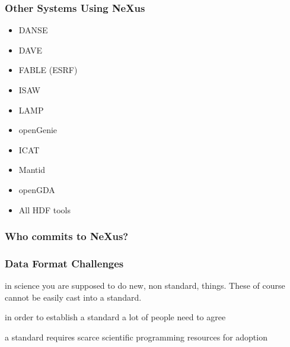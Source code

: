 \documentclass{beamer}
\begin{document}
\begin{frame} \frametitle{Other Systems Using NeXus}
\begin{itemize}
\item DANSE
\item DAVE
\item FABLE (ESRF)
\item ISAW
\item LAMP
\item openGenie
\item ICAT
\item Mantid
\item openGDA
\item All HDF tools
\end{itemize}
\end{frame}

\begin{frame} \frametitle{Who commits to NeXus? }
\begin{figure}[!ht]
\end{figure}
\end{frame}

\begin{frame} \frametitle{Data Format Challenges}
\begin{description}
\item<1->[Challenge 1] in science you are supposed to do new, non standard, things.  
 These of course cannot be easily cast into a standard.
\item<2->[Challenge 2] in order to establish a standard a lot of people need to agree
\item<3->[Challenge 3] a standard requires scarce scientific  programming resources for adoption 
\end{description}
\end{frame}
\end{document}
